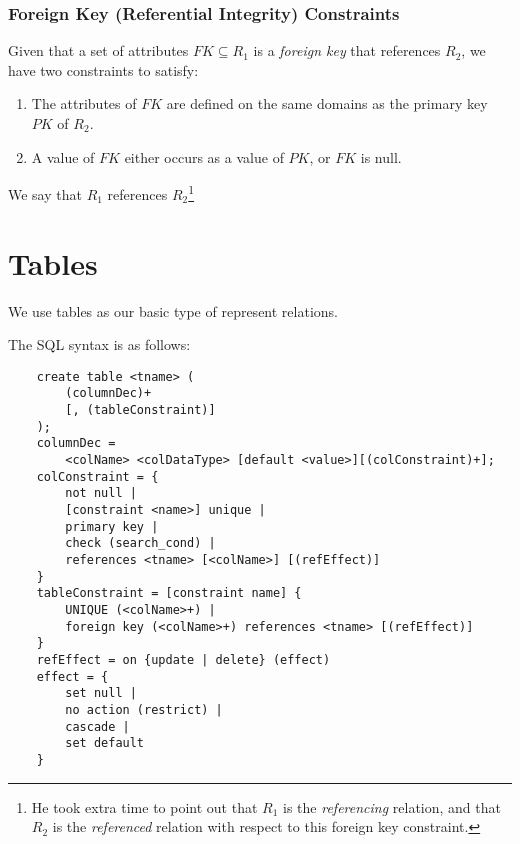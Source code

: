                 \subsubsection{Foreign Key (Referential Integrity) Constraints} %
                \label{ssub:foreign_key_referential_integrity_constraints}
                    Given that a set of attributes $FK \subseteq R_1$ is a \textit{foreign key} that references $R_2$, we have two constraints to satisfy:
                    \begin{enumerate}
                        \item The attributes of $FK$ are defined on the same domains as the primary key $PK$ of $R_2$.
                        \item A value of $FK$ either occurs as a value of $PK$, or $FK$ is null.
                    \end{enumerate}
                    We say that $R_1$ references $R_2$\footnote{He took extra time to point out that $R_1$ is the \textit{referencing} relation, and that $R_2$ is the \textit{referenced} relation with respect to this foreign key constraint.}
            \section{Tables} %
            \label{sec:tables}
                We use tables as our basic type of represent relations.

                The SQL syntax is as follows:
                \begin{verbatim}
    create table <tname> (
        (columnDec)+
        [, (tableConstraint)]
    );
    columnDec =
        <colName> <colDataType> [default <value>][(colConstraint)+];
    colConstraint = {
        not null |
        [constraint <name>] unique |
        primary key |
        check (search_cond) |
        references <tname> [<colName>] [(refEffect)]
    }
    tableConstraint = [constraint name] {
        UNIQUE (<colName>+) |
        foreign key (<colName>+) references <tname> [(refEffect)]
    }
    refEffect = on {update | delete} (effect)
    effect = {
        set null |
        no action (restrict) |
        cascade |
        set default
    }
                \end{verbatim}

